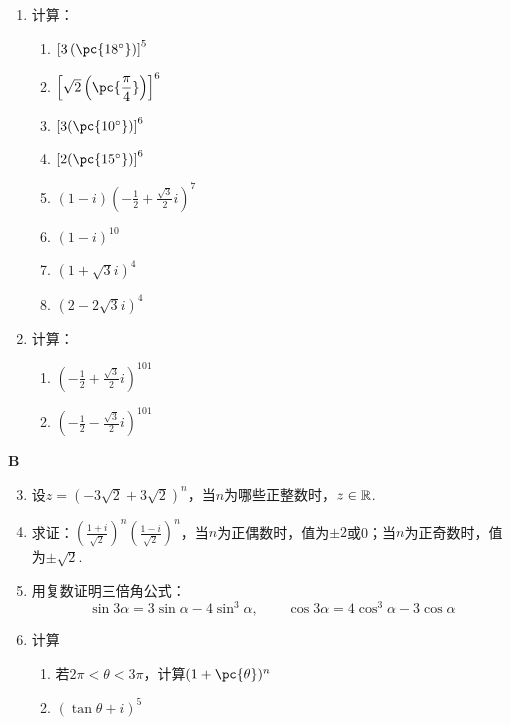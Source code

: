 \begin{enumerate}
    \item 计算：
\begin{multicols}{2}
\begin{enumerate}[(1)]
    \item $\left[3\left(\pc{18^{\circ}}\right)\right]^5$
    \item $\left[\sqrt{2}\left(\pc{\frac{\pi}{4}}\right)\right]^6$
    \item $\left[3(\pc{10^{\circ}})\right]^6$
    \item $\left[2(\pc{15^{\circ}})\right]^6$
    \item $(1-i)\left(-\frac{1}{2}+\frac{\sqrt{3}}{2}i\right)^7$
    \item $(1-i)^{10}$
    \item $\left(1+\sqrt{3}i\right)^4$
    \item $\left(2-2\sqrt{3}i\right)^4$
\end{enumerate}
\end{multicols}
    \item 计算：
\begin{multicols}{2}
\begin{enumerate}[(1)]
    \item $\left(-\frac{1}{2}+\frac{\sqrt{3}}{2}i\right)^{101}$
    \item $\left(-\frac{1}{2}-\frac{\sqrt{3}}{2}i\right)^{101}$
\end{enumerate}
\end{multicols}
\end{enumerate}

\begin{center}
    \bfseries B
\end{center}
\begin{enumerate}\setcounter{enumi}{2}
    \item 设$z=\left(-3\sqrt{2}+3\sqrt{2}\right)^n$，当$n$为哪些正整数时，$z\in\mathbb{R}$.
    \item 求证：$\left(\frac{1+i}{\sqrt{2}}\right)^n\left(\frac{1-i}{\sqrt{2}}\right)^n$，当$n$为正偶数时，值为$\pm 2$或0；当$n$为正奇数时，值为$\pm\sqrt{2}$.
    \item 用复数证明三倍角公式：
\[\sin3\alpha=3\sin\alpha-4\sin^3\alpha,\qquad \cos3\alpha=4\cos^3\alpha-3\cos\alpha\]
\item 计算 
\begin{enumerate}[(1)]
    \item 若$2\pi<\theta<3\pi$，计算$(1+\pc{\theta})^n$
    \item $(\tan\theta+i)^5$
\end{enumerate}
\end{enumerate}


